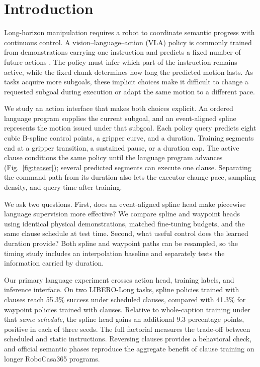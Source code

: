 \section{Introduction}
\label{sec:introduction}

Long-horizon manipulation requires a robot to coordinate semantic progress with continuous control. A vision--language--action (VLA) policy is commonly trained from demonstrations carrying one instruction and predicts a fixed number of future actions \cite{kim2024openvla,black2024pi0,shukor2025smolvla}. The policy must infer which part of the instruction remains active, while the fixed chunk determines how long the predicted motion lasts. As tasks acquire more subgoals, these implicit choices make it difficult to change a requested subgoal during execution or adapt the same motion to a different pace.

We study an action interface that makes both choices explicit. An ordered language program supplies the current subgoal, and an event-aligned spline represents the motion issued under that subgoal. Each policy query predicts eight cubic B-spline control points, a gripper curve, and a duration. Training segments end at a gripper transition, a sustained pause, or a duration cap. The active clause conditions the same policy until the language program advances (Fig.~\ref{fig:teaser}); several predicted segments can execute one clause. Separating the command path from its duration also lets the executor change pace, sampling density, and query time after training.

We ask two questions. First, does an event-aligned spline head make piecewise language supervision more effective? We compare spline and waypoint heads using identical physical demonstrations, matched fine-tuning budgets, and the same clause schedule at test time. Second, what useful control does the learned duration provide? Both spline and waypoint paths can be resampled, so the timing study includes an interpolation baseline and separately tests the information carried by duration.

Our primary language experiment crosses action head, training labels, and inference interface. On two LIBERO-Long tasks, spline policies trained with clauses reach 55.3\% success under scheduled clauses, compared with 41.3\% for waypoint policies trained with clauses. Relative to whole-caption training under that \emph{same schedule}, the spline head gains an additional 9.3 percentage points, positive in each of three seeds. The full factorial measures the trade-off between scheduled and static instructions. Reversing clauses provides a behavioral check, and official semantic phases reproduce the aggregate benefit of clause training on longer RoboCasa365 programs.

